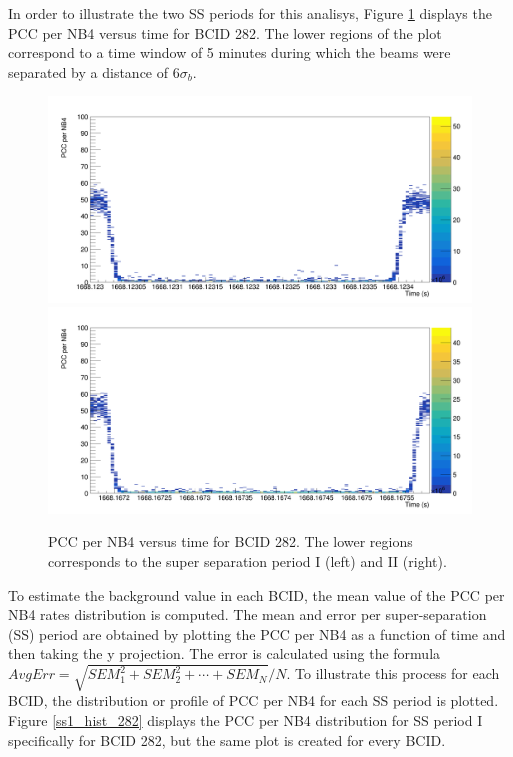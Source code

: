 In order to illustrate the two SS periods for this analisys, Figure \ref{ssp_wide_bx282} displays the PCC per NB4 versus time for BCID 282. The lower regions of the plot correspond to a time window of 5 minutes during which the beams were separated by a distance of $6\sigma_{b}$.\\

\begin{center}
\begin{figure}[h!]
\centering
\includegraphics[width=.49\textwidth]{Chapter4/BX_282_Rates_SS1.png}
\includegraphics[width=.49\textwidth]{Chapter4/BX_282_Rates_SS2.png}
\caption[Super Separation periods for BCID 282]{PCC per NB4 versus time for BCID 282. The lower regions corresponds to the super separation period I (left) and II (right).}
\label{ssp_wide_bx282}
\end{figure}
\end{center}

To estimate the background value in each BCID, the mean value of the PCC per NB4 rates distribution is computed. The mean and error per super-separation (SS) period are obtained by plotting the PCC per NB4 as a function of time and then taking the y projection. The error is calculated using the formula $AvgErr = \sqrt{SEM_1^2 + SEM_2^2 + \cdots + SEM_N}/N$. To illustrate this process for each BCID, the distribution or profile of PCC per NB4 for each SS period is plotted. Figure \ref{ss1_hist_282} displays the PCC per NB4 distribution for SS period I specifically for BCID 282, but the same plot is created for every BCID.\\

